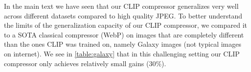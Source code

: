 \documentclass[final]{article}
\begin{document}
In the main text we have seen that our CLIP compressor generalizes very well across different datasets compared to high quality JPEG.
To better understand the limits of the generalization capacity of our CLIP compressor, we compared it to a SOTA classical compressor (WebP) on images that are completely different than the ones CLIP was trained on, namely Galaxy images (not typical images on internet).
We see in \cref{table:galaxy} that in this challenging setting our CLIP compressor only achieves relatively small gains ($30\%$).




  
\end{document}
